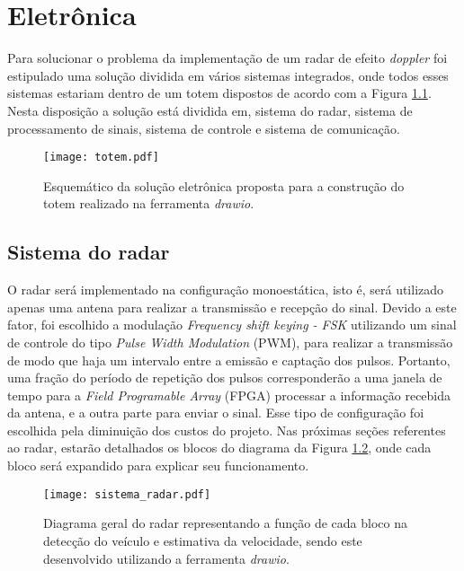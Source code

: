 \chapter{Eletrônica}

Para solucionar o problema da implementação de um radar de efeito \emph{doppler}  foi estipulado uma solução dividida em vários sistemas integrados, onde todos esses sistemas estariam dentro de um totem dispostos de acordo com a Figura \ref{esquematico1}. Nesta disposição a solução está dividida em, sistema do radar,  sistema de processamento de sinais, sistema de controle e sistema de comunicação.
\begin{figure}[H]
    \centering
    \texttt{[image: totem.pdf]}
    \caption{Esquemático da solução eletrônica proposta para a construção do totem realizado na ferramenta \emph{drawio}. }
    \label{esquematico1}
\end{figure}
\section{Sistema do radar}
O radar será implementado na configuração monoestática, isto é, será utilizado apenas uma  antena para realizar a transmissão e recepção do sinal. Devido a este fator, foi escolhido a modulação  \emph{ Frequency shift keying - FSK} utilizando um sinal de controle do tipo \emph{Pulse Width Modulation} (PWM), para realizar a transmissão de modo que haja um intervalo entre a emissão e captação dos pulsos. Portanto, uma fração do período de repetição dos pulsos corresponderão a uma janela de tempo para a \emph{Field Programable Array} (FPGA) processar a informação recebida da antena, e a outra parte para enviar o sinal. Esse tipo de configuração foi escolhida pela diminuição dos custos do projeto.
Nas próximas seções referentes ao radar, estarão detalhados os blocos do diagrama da Figura \ref{processos_geral_radar}, onde cada bloco será expandido para explicar seu funcionamento.
\begin{figure}[H]
    \centering
    \texttt{[image: sistema\_radar.pdf]}
    \caption{Diagrama geral do radar representando a função de cada bloco na detecção do veículo e estimativa da velocidade, sendo este desenvolvido utilizando a ferramenta \emph{drawio}.}
    \label{processos_geral_radar}
\end{figure}
